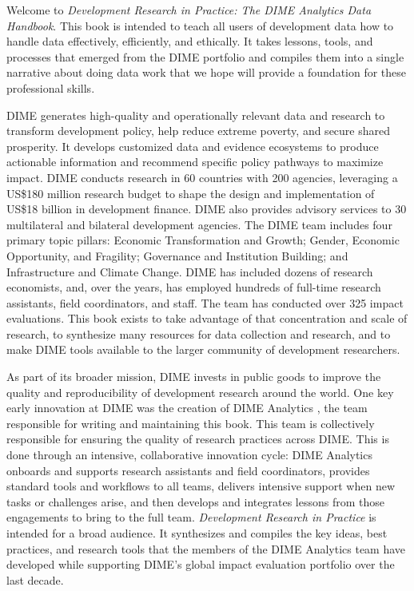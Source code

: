\begin{fullwidth}
Welcome to \textit{Development Research in Practice: The DIME Analytics Data Handbook}.
This book is intended to teach all users of development data
how to handle data effectively, efficiently, and ethically.
It takes lessons, tools, and processes that emerged from the DIME portfolio
and compiles them into a single narrative about doing data work
that we hope will provide a foundation for these professional skills.

DIME generates high-quality and operationally relevant data and research
to transform development policy, help reduce extreme poverty, and secure shared prosperity.
It develops customized data and evidence ecosystems to produce actionable information
and recommend specific policy pathways to maximize impact.
DIME conducts research in 60 countries with 200 agencies, leveraging a
US\$180 million research budget to shape the design and implementation of
US\$18 billion in development finance.
DIME also provides advisory services to 30 multilateral and bilateral development agencies.
The DIME team includes four primary topic pillars:
Economic Transformation and Growth;
Gender, Economic Opportunity, and Fragility;
Governance and Institution Building;
and Infrastructure and Climate Change.
DIME has included dozens of research economists,
and, over the years, has employed hundreds of full-time research assistants, field coordinators, and staff.
The team has conducted over 325 impact evaluations.
This book exists to take advantage of that concentration and scale of research,
to synthesize many resources for data collection and research,
and to make DIME tools available to the larger community of development researchers.

As part of its broader mission, DIME invests in public goods
to improve the quality and reproducibility of development research around the world.
One key early innovation at DIME was the creation of DIME Analytics ,
the team responsible for writing and maintaining this book.
This team is collectively responsible for ensuring the quality of research practices across DIME.
This is done through an intensive, collaborative innovation cycle:
DIME Analytics onboards and supports research assistants and field coordinators,
provides standard tools and workflows to all teams,
delivers intensive support when new tasks or challenges arise,
and then develops and integrates lessons from those engagements to bring to the full team.
\textit{Development Research in Practice} is intended for a broad audience.
It synthesizes and compiles the key ideas, best practices, and research tools
that the members of the DIME Analytics team have developed while supporting
DIME's global impact evaluation portfolio over the last decade.

\end{fullwidth}

